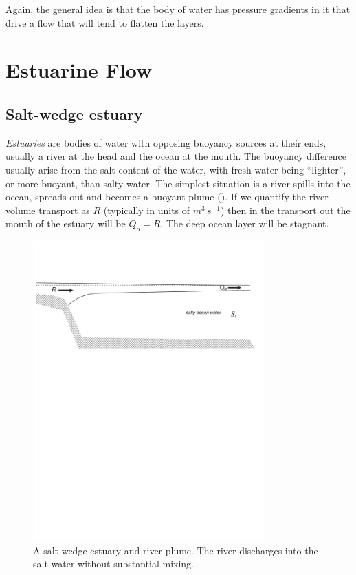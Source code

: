 Again, the general idea is that the body of water has pressure gradients in it that drive a flow that will tend to flatten the layers.




\section{Estuarine Flow}

\subsection{Salt-wedge estuary}

\emph{Estuaries} are bodies of water with opposing buoyancy sources at their ends, usually a river at the head and the ocean at the mouth.  The buoyancy difference usually arise from the salt content of the water, with fresh water being ``lighter'', or more buoyant, than salty water.   The simplest situation is a river spills into the ocean, spreads out and becomes a buoyant plume ().  If we quantify the river volume transport as $R$ (typically in units of $m^3\,s^{-1}$) then in  the transport out the mouth of the estuary will be $Q_o=R$.  The deep ocean layer will be stagnant.

\begin{figure}[htb]
  \centering
  \includegraphics[width=3.5in]{figs/EstuaryNoMix}
  \caption{A salt-wedge estuary and river plume.  The river discharges
    into the salt water without substantial mixing.}
  \label{fig:EstuaryNoMix}
\end{figure}

